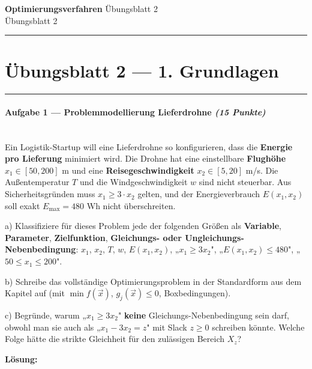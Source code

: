 \documentclass[11pt, a4paper]{article}
\providecommand{\nichttitle}{Übungsblatt}
\providecommand{\nichtsubtitle}{}
\renewcommand{\nichttitle}{Optimierungsverfahren}
\renewcommand{\nichtsubtitle}{Übungsblatt 2}
\begin{document}
\begin{center}
{\Large\bfseries\color{accent}\nichttitle}
\ifx\nichtsubtitle\empty\else
  \\[2pt]{\normalsize\color{accent!80!black}\nichtsubtitle}
\fi
\\[2pt]
\color{accent}\rule{0.4\linewidth}{0.8pt}\color{black}
\end{center}
\vspace{4pt}


\section{Übungsblatt 2 — 1. Grundlagen}


\noindent\textcolor{rulegray}{\rule{\linewidth}{0.4pt}}


\paragraph{Aufgabe 1 — Problemmodellierung Lieferdrohne \textit{(15 Punkte)}}\mbox{}\\[2pt]

Ein Logistik-Startup will eine Lieferdrohne so konfigurieren, dass die \textbf{Energie pro Lieferung} minimiert wird. Die Drohne hat eine einstellbare \textbf{Flughöhe} $x_1 \in [50, 200]$ m und eine \textbf{Reisegeschwindigkeit} $x_2 \in [5, 20]$ m/s. Die Außentemperatur $T$ und die Windgeschwindigkeit $w$ sind nicht steuerbar. Aus Sicherheitsgründen muss $x_1 \geq 3 \cdot x_2$ gelten, und der Energieverbrauch $E(x_1,x_2)$ soll exakt $E_{\max} = 480$ Wh nicht überschreiten.


a) Klassifiziere für dieses Problem jede der folgenden Größen als \textbf{Variable}, \textbf{Parameter}, \textbf{Zielfunktion}, \textbf{Gleichungs- oder Ungleichungs-Nebenbedingung}: $x_1$, $x_2$, $T$, $w$, $E(x_1,x_2)$, „$x_1 \geq 3x_2$", „$E(x_1,x_2) \leq 480$", „$50 \leq x_1 \leq 200$".


b) Schreibe das vollständige Optimierungsproblem in der Standardform aus dem Kapitel auf (mit $\min f(\vec x)$, $g_j(\vec x) \leq 0$, Boxbedingungen).


c) Begründe, warum „$x_1 \geq 3x_2$" \textbf{keine} Gleichungs-Nebenbedingung sein darf, obwohl man sie auch als „$x_1 - 3x_2 = z$" mit Slack $z \geq 0$ schreiben könnte. Welche Folge hätte die strikte Gleichheit für den zulässigen Bereich $X_z$?


\textbf{Lösung:}
\end{document}
